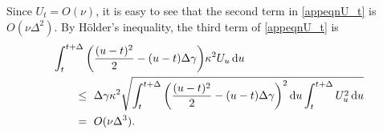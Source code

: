 \documentclass{ws-ijfe}
\begin{document}
Since $U_t=O(\nu)$, it is easy to see that the second term in \eqref{appeqnU_t} is $O(\nu\Delta^2)$. By H\"older's inequality, the third term of \eqref{appeqnU_t} is
\begin{align*}
   & \int_{t}^{t+\Delta}\bigg(\frac{(u-t)^2}{2}-(u-t)\Delta\gamma \bigg)\kappa^2U_u\,\mathrm{d} u \\
   &\quad\quad\leq\,\, \Delta\gamma \kappa^2\sqrt{\int_{t}^{t+\Delta}\bigg(\frac{(u-t)^2}{2}-(u-t)\Delta\gamma \bigg)^2\,\mathrm{d} u\int_{t}^{t+\Delta}U_u^2\,\mathrm{d} u}\\
   &\quad\quad = \,\,O(\nu\Delta^3).
\end{align*}
\end{document}
